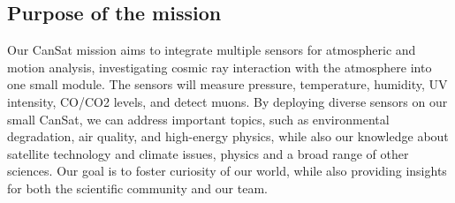 \subsection{Purpose of the mission}

Our CanSat mission aims to integrate multiple sensors for atmospheric and motion analysis, investigating cosmic ray interaction with the atmosphere into one small module. The sensors will measure pressure, temperature, humidity, UV intensity, CO/CO2 levels, and detect muons. By deploying diverse sensors on our small CanSat, we can address important topics, such as environmental degradation, air quality, and high-energy physics, while also our knowledge about satellite technology and climate issues, physics and a broad range of other sciences. Our goal is to foster curiosity of our world, while also providing insights for both the scientific community and our team. 